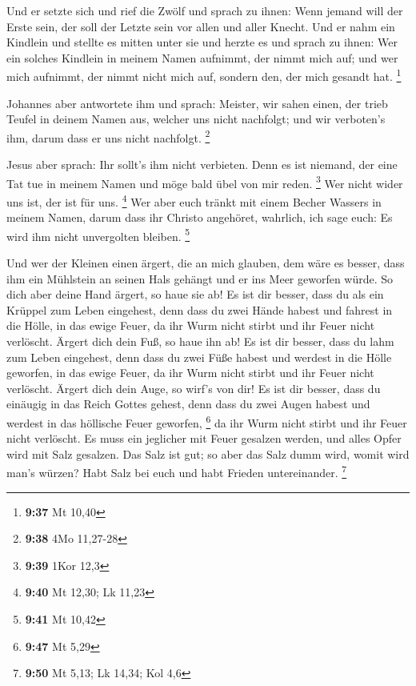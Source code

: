 Und er setzte sich und rief die Zwölf und sprach zu ihnen:
Wenn jemand will der Erste sein, der soll der Letzte sein vor allen und
aller Knecht.  Und er nahm ein Kindlein und stellte es
mitten unter sie und herzte es und sprach zu ihnen:  Wer
ein solches Kindlein in meinem Namen aufnimmt, der nimmt mich auf; und
wer mich aufnimmt, der nimmt nicht mich auf, sondern den, der mich
gesandt hat. \footnote{\textbf{9:37} Mt 10,40}

 Johannes aber antwortete ihm und sprach: Meister, wir
sahen einen, der trieb Teufel in deinem Namen aus, welcher uns nicht
nachfolgt; und wir verboten's ihm, darum dass er uns nicht nachfolgt.
\footnote{\textbf{9:38} 4Mo 11,27-28}

 Jesus aber sprach: Ihr sollt's ihm nicht verbieten. Denn
es ist niemand, der eine Tat tue in meinem Namen und möge bald übel von
mir reden. \footnote{\textbf{9:39} 1Kor 12,3}  Wer nicht
wider uns ist, der ist für uns. \footnote{\textbf{9:40} Mt 12,30; Lk
  11,23}  Wer aber euch tränkt mit einem Becher Wassers in
meinem Namen, darum dass ihr Christo angehöret, wahrlich, ich sage euch:
Es wird ihm nicht unvergolten bleiben. \footnote{\textbf{9:41} Mt 10,42}

 Und wer der Kleinen einen ärgert, die an mich glauben, dem
wäre es besser, dass ihm ein Mühlstein an seinen Hals gehängt und er ins
Meer geworfen würde.  So dich aber deine Hand ärgert, so
haue sie ab! Es ist dir besser, dass du als ein Krüppel zum Leben
eingehest, denn dass du zwei Hände habest und fahrest in die Hölle, in
das ewige Feuer,  da ihr Wurm nicht stirbt und ihr Feuer
nicht verlöscht.  Ärgert dich dein Fuß, so haue ihn ab! Es
ist dir besser, dass du lahm zum Leben eingehest, denn dass du zwei Füße
habest und werdest in die Hölle geworfen, in das ewige Feuer,
 da ihr Wurm nicht stirbt und ihr Feuer nicht verlöscht.
 Ärgert dich dein Auge, so wirf's von dir! Es ist dir
besser, dass du einäugig in das Reich Gottes gehest, denn dass du zwei
Augen habest und werdest in das höllische Feuer geworfen, \footnote{\textbf{9:47}
  Mt 5,29}  da ihr Wurm nicht stirbt und ihr Feuer nicht
verlöscht.  Es muss ein jeglicher mit Feuer gesalzen
werden, und alles Opfer wird mit Salz gesalzen.  Das Salz
ist gut; so aber das Salz dumm wird, womit wird man's würzen? Habt Salz
bei euch und habt Frieden untereinander. \footnote{\textbf{9:50} Mt
  5,13; Lk 14,34; Kol 4,6}

